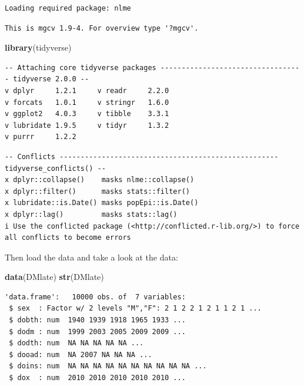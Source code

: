 \documentclass[
]{book}
\newenvironment{Shaded}{\begin{snugshade}}{\end{snugshade}}
\newcommand{\FunctionTok}[1]{\textcolor[rgb]{0.13,0.29,0.53}{\textbf{#1}}}
\newcommand{\NormalTok}[1]{#1}
\begin{document}
\begin{verbatim}
Loading required package: nlme
\end{verbatim}

\begin{verbatim}
This is mgcv 1.9-4. For overview type '?mgcv'.
\end{verbatim}

\begin{Shaded}
\begin{Highlighting}[]
\FunctionTok{library}\NormalTok{(tidyverse)}
\end{Highlighting}
\end{Shaded}

\begin{verbatim}
-- Attaching core tidyverse packages ---------------------------------- tidyverse 2.0.0 --
v dplyr     1.2.1     v readr     2.2.0
v forcats   1.0.1     v stringr   1.6.0
v ggplot2   4.0.3     v tibble    3.3.1
v lubridate 1.9.5     v tidyr     1.3.2
v purrr     1.2.2     
\end{verbatim}

\begin{verbatim}
-- Conflicts ---------------------------------------------------- tidyverse_conflicts() --
x dplyr::collapse()    masks nlme::collapse()
x dplyr::filter()      masks stats::filter()
x lubridate::is.Date() masks popEpi::is.Date()
x dplyr::lag()         masks stats::lag()
i Use the conflicted package (<http://conflicted.r-lib.org/>) to force all conflicts to become errors
\end{verbatim}

Then load the data and take a look at the data:

\begin{Shaded}
\begin{Highlighting}[]
\FunctionTok{data}\NormalTok{(DMlate)}
\FunctionTok{str}\NormalTok{(DMlate)}
\end{Highlighting}
\end{Shaded}

\begin{verbatim}
'data.frame':   10000 obs. of  7 variables:
 $ sex  : Factor w/ 2 levels "M","F": 2 1 2 2 1 2 1 1 2 1 ...
 $ dobth: num  1940 1939 1918 1965 1933 ...
 $ dodm : num  1999 2003 2005 2009 2009 ...
 $ dodth: num  NA NA NA NA NA ...
 $ dooad: num  NA 2007 NA NA NA ...
 $ doins: num  NA NA NA NA NA NA NA NA NA NA ...
 $ dox  : num  2010 2010 2010 2010 2010 ...
\end{verbatim}
\end{document}
